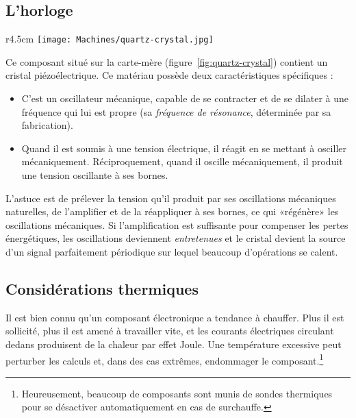 \subsection{L'horloge}
\begin{wrapfigure}{r}{4.5cm}
\texttt{[image: Machines/quartz-crystal.jpg]}
\caption{\label{fig:quartz-crystal}Horloge dans la carte-mère.}
\end{wrapfigure}
Ce composant situé sur la carte-mère (figure~\ref{fig:quartz-crystal}) contient un cristal piézoélectrique. Ce matériau possède deux caractéristiques spécifiques :
	\begin{itemize}
	\item C'est un oscillateur mécanique, capable de se contracter et de se dilater à une fréquence qui lui est propre (sa \emph{fréquence de résonance}, déterminée par sa fabrication).
	\item Quand il est soumis à une tension électrique, il réagit en se mettant à osciller mécaniquement. Réciproquement, quand il oscille mécaniquement, il produit une tension oscillante à ses bornes.
	\end{itemize}
L'astuce est de prélever la tension qu'il produit par ses oscillations mécaniques naturelles, de l'amplifier et de la réappliquer à ses bornes, ce qui «régénère» les oscillations mécaniques. Si l'amplification est suffisante pour compenser les pertes énergétiques, les oscillations deviennent \emph{entretenues} et le cristal devient la source d'un signal parfaitement périodique sur lequel beaucoup d'opérations se calent.
\subsection{Considérations thermiques}
Il est bien connu qu'un composant électronique a tendance à chauffer. Plus il est sollicité, plus il est amené à travailler vite, et les courants électriques circulant dedans produisent de la chaleur par effet Joule. Une température excessive peut perturber les calculs et, dans des cas extrêmes, endommager le composant.\footnote{Heureusement, beaucoup de composants sont munis de sondes thermiques pour se désactiver automatiquement en cas de surchauffe.}

